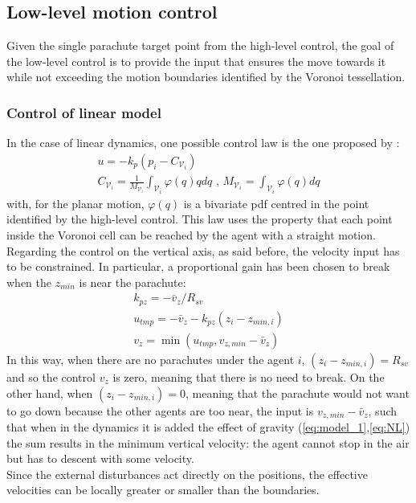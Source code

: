 \subsection{Low-level motion control}
Given the single parachute target point from the high-level control, the goal of the low-level control is to provide the input that ensures the move towards it while not exceeding the motion boundaries identified by the Voronoi tessellation. 
\subsubsection{Control of linear model}
In the case of linear dynamics, one possible control law is the one proposed by \cite{b1}:
\begin{gather}
    \label{eq:proportional}
    u=-k_p\left(p_i - C_{\mathcal{V}_i}\right)\\
    \label{centroid}
    C_{\mathcal{V}_i} = \frac{1}{M_{\mathcal{V}_i}}\int_{\mathcal{V}_i}\varphi\left(q\right)qdq \text{ , } M_{\mathcal{V}_i} = \int_{\mathcal{V}_i}\varphi\left(q\right)dq
\end{gather}
with, for the planar motion, $\varphi\left(q\right)$ is a bivariate pdf centred in the point identified by the high-level control. This law uses the property that each point inside the Voronoi cell can be reached by the agent with a straight motion.\\
Regarding the control on the vertical axis, as said before, the velocity input has to be constrained. In particular, a proportional gain has been chosen to break when the $z_{min}$ is near the parachute:
\begin{equation}
\label{control_law_z}
    \begin{gathered}
        k_{pz}=-\bar{v}_z/R_{sv}\\
        u_{tmp}=-\bar{v}_z-k_{pz}(z_i-z_{min,i})\\
        v_z=\min(u_{tmp}, v_{z,min}-\bar{v}_z)
    \end{gathered}
\end{equation}
In this way, when there are no parachutes under the agent $i$, $(z_i-z_{min,i})=R_{sv}$ and so the control $v_z$ is zero, meaning that there is no need to break. On the other hand, when $(z_i-z_{min,i})=0$, meaning that the parachute would not want to go down because the other agents are too near, the input is $v_{z,min}-\bar{v}_z$, such that when in the dynamics it is added the effect of gravity (\ref{eq:model_1},\ref{eq:NL}) the sum results in the minimum vertical velocity: the agent cannot stop in the air but has to descent with some velocity.\\
Since the external disturbances act directly on the positions, the effective velocities can be locally greater or smaller than the boundaries.
